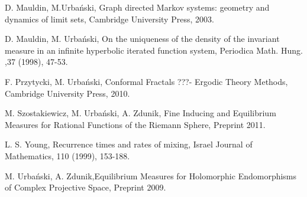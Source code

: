 \documentclass[12pt]{amsart}
\numberwithin{equation}{section}
\begin{document}
\begin{thebibliography}{9999999}

D. Mauldin, M.Urba\'nski, Graph directed Markov
  systems: geometry and dynamics of limit sets, Cambridge University
  Press, 2003.

D. Mauldin, M. Urba\'nski, On the uniqueness of the
  density of the invariant measure in an infinite hyperbolic iterated
  function system, Periodica Math. Hung. ,37 (1998), 47-53.

F. Przytycki, M. Urba\'nski, Conformal Fractals ???-
Ergodic Theory Methods, Cambridge University Press, 2010.

M. Szostakiewicz, M. Urba\'nski, A. Zdunik,
Fine Inducing and Equilibrium Measures for Rational Functions of the
Riemann Sphere, Preprint 2011.

L. S. Young, Recurrence times and rates of
mixing, Israel Journal of Mathematics, 110 (1999), 153-188.

M. Urba\'nski, A. Zdunik,Equilibrium Measures for Holomorphic
Endomorphisms of Complex Projective Space, Preprint 2009.


\end{thebibliography}
\end{document}
